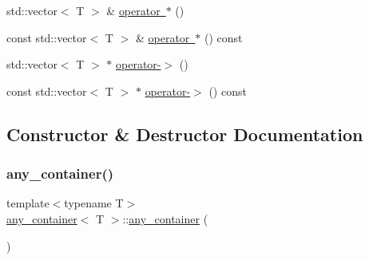 \begin{DoxyCompactItemize}
\item 
std\+::vector$<$ T $>$ \& \mbox{\hyperlink{classany__container_a3d97f9a1acbca473d49914722f5a102e}{operator $\ast$}} ()
\item 
const std\+::vector$<$ T $>$ \& \mbox{\hyperlink{classany__container_ab94e9ff5873cb2551b5e1a00fa8dc3cf}{operator $\ast$}} () const
\item 
std\+::vector$<$ T $>$ $\ast$ \mbox{\hyperlink{classany__container_a47c855832d83d1ccb543ff206b59f327}{operator-\/$>$}} ()
\item 
const std\+::vector$<$ T $>$ $\ast$ \mbox{\hyperlink{classany__container_ac8c067f37efdffba9d64bf34823c4ad6}{operator-\/$>$}} () const
\end{DoxyCompactItemize}


\subsection{Constructor \& Destructor Documentation}
\mbox{\label{classany__container_ada7ea5cc76b0faf62d22d9bd3deca147}} 
\subsubsection{\texorpdfstring{any\_container()}{any\_container()}\hspace{0.1cm}{\footnotesize\ttfamily [1/5]}}
{\footnotesize\ttfamily template$<$typename T$>$ \\
\mbox{\hyperlink{classany__container}{any\+\_\+container}}$<$ T $>$\+::\mbox{\hyperlink{classany__container}{any\+\_\+container}} (\begin{DoxyParamCaption}{ }\end{DoxyParamCaption})\hspace{0.3cm}{\ttfamily [default]}}

\mbox{\label{classany__container_a16c36f2f2714692d2112d66cf539f882}} 
